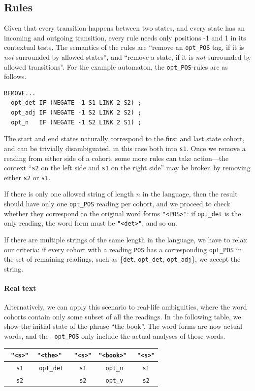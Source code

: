 \documentclass[11pt]{article}
\def\t#1{\texttt{#1}}
\def\h#1{{\tt \color{gray} #1}}
\def\swf{\h{"<s>"}}
\begin{document}
\subsection{Rules}
Given that every transition happens between two states, and every state 
has an incoming and outgoing transition, every rule needs only
positions -1 and 1 in its contextual tests. 
The semantics of the rules are ``remove an \t{opt\_POS} tag, if it is 
\emph{not} surrounded by allowed states'',
and ``remove a state, if it is \emph{not} surrounded by allowed transitions''.
For the example automaton, the \t{opt\_POS}-rules are as follows.
\begin{verbatim}
REMOVE...
  opt_det IF (NEGATE -1 S1 LINK 2 S2) ;
  opt_adj IF (NEGATE -1 S2 LINK 2 S2) ;
  opt_n   IF (NEGATE -1 S2 LINK 2 S1) ;
\end{verbatim}
\noindent The start and end states naturally correspond to the first and last
state cohort, and can be trivially disambiguated, in this case both into \t{s1}.
Once we remove a reading from either side of a cohort, some more rules can take
action---the context ``\t{s2} on the left side and \t{s1} on the right side''
may be broken by removing either \t{s2} or \t{s1}. 

If there is only one allowed string of length $n$ in the language, then the
result should have only one \t{opt\_POS} reading per cohort, and we proceed to
check whether they correspond to the original word forms \t{"<POS>"}: if
\t{opt\_det} is the only reading, the word form must be \t{"<det>"}, and so on.

If there are multiple strings of the same length in the language, we have to
relax our criteria: if every cohort with a reading \t{POS} has a corresponding
\t{opt\_POS} in the set of remaining readings, such as \{\t{det}, \t{opt\_det},
\t{opt\_adj}\}, we accept the string.


\paragraph{Real text}
Alternatively, we can apply this scenario to real-life ambiguities, where the word cohorts
contain only some subset of all the readings. 
In the following table, we show the initial state of the phrase ``the book''.
The word forms are now actual words, and the \t{\h{opt\_}POS} only include the actual analyses of those words.


\begin{table}[h]
  \centering\small
  \begin{tabular}{c|c|c|c|c}
    \swf   & \t{"<the>"}  & \swf  & \t{"<book>"} & \swf   \\ \hline
    \h{s1} & \t{\h{opt\_}det}     & \h{s1} & \t{\h{opt\_}n} & \h{s1} \\
    \h{s2} &                      & \h{s2} & \t{\h{opt\_}v} & \h{s2} \\

  \end{tabular}
\end{table}
\end{document}
